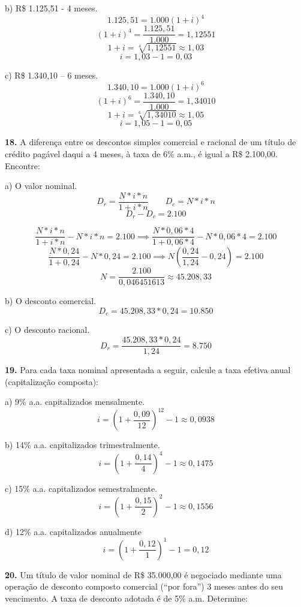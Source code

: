 \documentclass[12pt,a4paper]{article}
\begin{document}
  \hspace*{.5cm} b) R\$ 1.125,51 - 4 meses.
  \[
    1.125,51 = 1.000 (1+i)^4
  \]
  \[
    (1+i)^4 = \frac{1.125,51}{1.000} = 1,12551
  \]
  \[
    1+i = \sqrt[4]{1,12551} \approx 1,03
  \]
  \[
    i = 1,03 - 1 = 0,03
  \]

  \hspace*{.5cm} c) R\$ 1.340,10 – 6 meses.
  \[
    1.340,10 = 1.000 ( 1 + i)^6
  \]
  \[
    (1 + i)^6 = \frac{1.340,10}{1.000} = 1,34010
  \]
  \[
    1 + i = \sqrt[6]{1,34010} \approx 1,05
  \]
  \[
    i = 1,05 - 1 = 0,05
  \]

  \textbf{18.} A diferença entre os descontos simples comercial e racional de um título de crédito
  pagável daqui a 4 meses, à taxa de 6\% a.m., é igual a R\$ 2.100,00. Encontre:

  a) O valor nominal.
  \[
    D_r = \frac{N*i*n}{1+i*n} \qquad D_c = N*i*n
  \]
  \[
    D_r - D_c = 2.100
  \]

  \[
     \frac{N*i*n}{1+i*n} -  N*i*n = 2.100 \implies \frac{N*0,06*4}{1+0,06*4} -  N*0,06*4 = 2.100
  \]
  \[
    \frac{N*0,24}{1+0,24} -  N*0,24 = 2.100 \implies N \left( \frac{0,24}{1,24} - 0,24 \right) = 2.100
  \]
  \[
    N = \frac{2.100}{0,046451613} \approx 45.208,33
  \]

  b) O desconto comercial.
  \[
    D_c = 45.208,33*0,24 = 10.850
  \]

  c) O desconto racional.
  \[
    D_r = \frac{45.208,33*0,24}{1,24} = 8.750
  \]

  \textbf{19.} Para cada taxa nominal apresentada a seguir, calcule a taxa 
  efetiva anual (capitalização composta):

  a) 9\% a.a. capitalizados mensalmente.
  \[
    i = \left( 1 + \frac{0,09}{12} \right)^12 - 1 \approx 0,0938
  \]

  b) 14\% a.a. capitalizados trimestralmente.
  \[
    i = \left( 1 + \frac{0,14}{4} \right)^4 - 1 \approx 0,1475
  \]
  
  c) 15\% a.a. capitalizados semestralmente.
  \[
    i = \left( 1 + \frac{0,15}{2} \right)^2 - 1 \approx 0,1556
  \]
  
  d) 12\% a.a. capitalizados anualmente
  \[
    i = \left( 1 + \frac{0,12}{1} \right)^1 - 1 = 0,12
  \]

  \textbf{20.} Um título de valor nominal de R\$ 35.000,00 é negociado mediante uma operação
  de desconto composto comercial (“por fora”) 3 meses antes do seu vencimento. A taxa
  de desconto adotada é de 5\% a.m. Determine:
\end{document}
